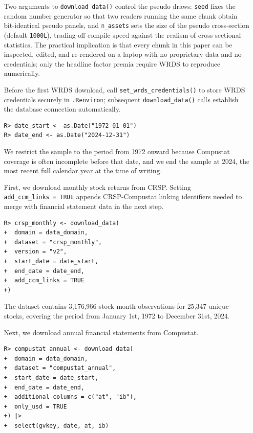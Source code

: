 \documentclass[
  article]{jss}
\begin{document}
Two arguments to \texttt{download\_data()} control the pseudo draws:
\texttt{seed} fixes the random number generator so that two readers
running the same chunk obtain bit-identical pseudo panels, and
\texttt{n\_assets} sets the size of the pseudo cross-section (default
\texttt{1000L}), trading off compile speed against the realism of
cross-sectional statistics. The practical implication is that every
chunk in this paper can be inspected, edited, and re-rendered on a
laptop with no proprietary data and no credentials; only the headline
factor premia require WRDS to reproduce numerically.

Before the first WRDS download, call \texttt{set\_wrds\_credentials()}
to store WRDS credentials securely in \texttt{.Renviron}; subsequent
\texttt{download\_data()} calls establish the database connection
automatically.

\begin{verbatim}
R> date_start <- as.Date("1972-01-01")
R> date_end <- as.Date("2024-12-31")
\end{verbatim}

We restrict the sample to the period from 1972 onward because Compustat
coverage is often incomplete before that date, and we end the sample at
2024, the most recent full calendar year at the time of writing.

First, we download monthly stock returns from CRSP. Setting
\texttt{add\_ccm\_links\ =\ TRUE} appends CRSP-Compustat linking
identifiers needed to merge with financial statement data in the next
step.

\begin{verbatim}
R> crsp_monthly <- download_data(
+  domain = data_domain,
+  dataset = "crsp_monthly",
+  version = "v2",
+  start_date = date_start,
+  end_date = date_end,
+  add_ccm_links = TRUE
+)
\end{verbatim}

The dataset contains 3,176,966 stock-month observations for 25,347
unique stocks, covering the period from January 1st, 1972 to December
31st, 2024.

Next, we download annual financial statements from Compustat.

\begin{verbatim}
R> compustat_annual <- download_data(
+  domain = data_domain,
+  dataset = "compustat_annual",
+  start_date = date_start,
+  end_date = date_end,
+  additional_columns = c("at", "ib"),
+  only_usd = TRUE
+) |>
+  select(gvkey, date, at, ib)
\end{verbatim}
\end{document}
